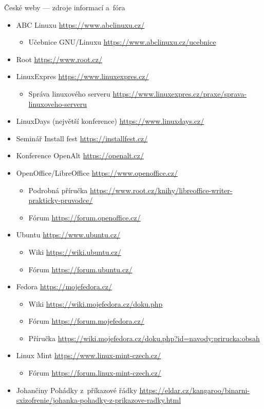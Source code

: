 \documentclass[compress, xelatex, 11pt, xcolor=svgnames, aspectratio=169, url={hyphens, lowtilde}]{beamer}
\begin{document}
\begin{frame}[allowframebreaks]{České weby --- zdroje informací a~fóra}
	\begin{itemize}
		\item ABC Linuxu \url{https://www.abclinuxu.cz/}
		\begin{itemize}
			\item Učebnice GNU/Linuxu \url{https://www.abclinuxu.cz/ucebnice}
		\end{itemize}
		\item Root \url{https://www.root.cz/}
		\item LinuxExpres \url{https://www.linuxexpres.cz/}
		\begin{itemize}
			\item Správa linuxového serveru \url{https://www.linuxexpres.cz/praxe/sprava-linuxoveho-serveru}
		\end{itemize}
		\item LinuxDays (největší konference) \url{https://www.linuxdays.cz/}
		\item Seminář Install fest \url{https://installfest.cz/}
		\item Konference OpenAlt \url{https://openalt.cz/}
		\item OpenOffice/LibreOffice \url{https://www.openoffice.cz/}
		\begin{itemize}
			\item Podrobná příručka \url{https://www.root.cz/knihy/libreoffice-writer-prakticky-pruvodce/}
			\item Fórum \url{https://forum.openoffice.cz/}
		\end{itemize}
		\item Ubuntu \url{https://www.ubuntu.cz/}
		\begin{itemize}
			\item Wiki \url{https://wiki.ubuntu.cz/}
			\item Fórum \url{https://forum.ubuntu.cz/}
		\end{itemize}
		\item Fedora \url{https://mojefedora.cz/}
		\begin{itemize}
			\item Wiki \url{https://wiki.mojefedora.cz/doku.php}
			\item Fórum \url{https://forum.mojefedora.cz/}
			\item Příručka \url{https://wiki.mojefedora.cz/doku.php?id=navody:prirucka:obsah}
		\end{itemize}
		\item Linux Mint \url{https://www.linux-mint-czech.cz/}
		\begin{itemize}
			\item Fórum \url{https://forum.linux-mint-czech.cz/}
		\end{itemize}
		\item Johančiny Pohádky z~příkazové řádky \url{https://eldar.cz/kangaroo/binarni-sxizofrenie/johanka-pohadky-z-prikazove-radky.html}
	\end{itemize}
\end{frame}
\end{document}
